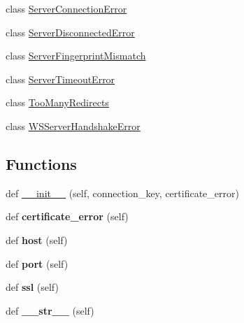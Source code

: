\begin{DoxyCompactItemize}
\item 
class \hyperlink{classaiohttp_1_1client__exceptions_1_1_server_connection_error}{Server\+Connection\+Error}
\item 
class \hyperlink{classaiohttp_1_1client__exceptions_1_1_server_disconnected_error}{Server\+Disconnected\+Error}
\item 
class \hyperlink{classaiohttp_1_1client__exceptions_1_1_server_fingerprint_mismatch}{Server\+Fingerprint\+Mismatch}
\item 
class \hyperlink{classaiohttp_1_1client__exceptions_1_1_server_timeout_error}{Server\+Timeout\+Error}
\item 
class \hyperlink{classaiohttp_1_1client__exceptions_1_1_too_many_redirects}{Too\+Many\+Redirects}
\item 
class \hyperlink{classaiohttp_1_1client__exceptions_1_1_w_s_server_handshake_error}{W\+S\+Server\+Handshake\+Error}
\end{DoxyCompactItemize}
\subsection*{Functions}
\begin{DoxyCompactItemize}
\item 
def \hyperlink{namespaceaiohttp_1_1client__exceptions_a03625909eea6f3db6fbc8d1cea0c430a}{\+\_\+\+\_\+init\+\_\+\+\_\+} (self, connection\+\_\+key, certificate\+\_\+error)
\item 
\mbox{\label{namespaceaiohttp_1_1client__exceptions_a1c24c822d55af3ec6fbaf288a6d20c24}} 
def {\bfseries certificate\+\_\+error} (self)
\item 
\mbox{\label{namespaceaiohttp_1_1client__exceptions_a38d7affedb2ad37c1fd15c5c9f868ab9}} 
def {\bfseries host} (self)
\item 
\mbox{\label{namespaceaiohttp_1_1client__exceptions_ae24890d892067a34ea441a5578defd20}} 
def {\bfseries port} (self)
\item 
\mbox{\label{namespaceaiohttp_1_1client__exceptions_abc58c4c11099919f3a06bb7f87315c04}} 
def {\bfseries ssl} (self)
\item 
\mbox{\label{namespaceaiohttp_1_1client__exceptions_a878d5680941b1753fe37edf2d31e7d2a}} 
def {\bfseries \+\_\+\+\_\+str\+\_\+\+\_\+} (self)
\end{DoxyCompactItemize}
